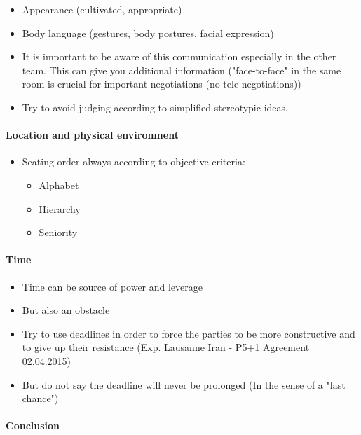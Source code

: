 \begin{itemize}
    \item Appearance (cultivated, appropriate)
    \item Body language (gestures, body postures, facial expression)
    \item It is important to be aware of this communication especially in the
        other team. This can give you additional information ("face-to-face" in
        the same room is crucial for important negotiations (no tele-negotiations))
    \item Try to avoid judging according to simplified stereotypic ideas.
\end{itemize}

\paragraph{Location and physical environment}

\begin{itemize}
    \item Seating order always according to objective criteria:
        \begin{itemize}
            \item Alphabet
            \item Hierarchy
            \item Seniority
        \end{itemize}
\end{itemize}

\paragraph{Time}

\begin{itemize}
    \item Time can be source of power and leverage
    \item But also an obstacle
    \item Try to use deadlines in order to force the parties to be more constructive
        and to give up their resistance (Exp. Lausanne Iran - P5+1 Agreement 02.04.2015)
    \item But do not say the deadline will never be prolonged (In the sense of
        a "last chance")
\end{itemize}

\paragraph{Conclusion}

